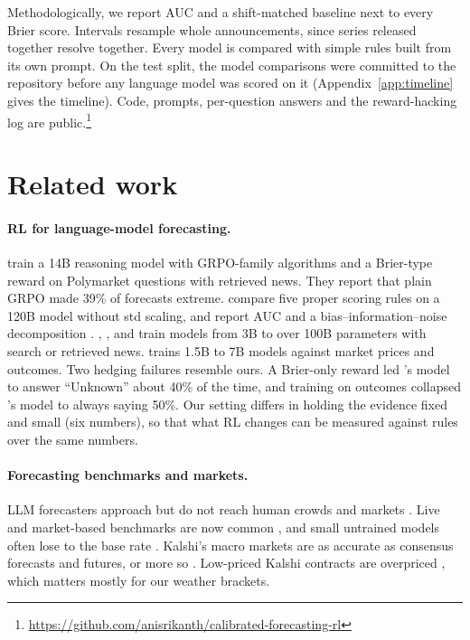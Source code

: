 \documentclass[11pt]{article}
\begin{document}
Methodologically, we report AUC and a shift-matched baseline next to every Brier score. Intervals resample whole announcements, since series released together resolve together. Every model is compared with simple rules built from its own prompt. On the test split, the model comparisons were committed to the repository before any language model was scored on it (Appendix~\ref{app:timeline} gives the timeline). Code, prompts, per-question answers and the reward-hacking log are public.\footnote{\url{https://github.com/anisrikanth/calibrated-forecasting-rl}}

\section{Related work}

\paragraph{RL for language-model forecasting.} \citet{turtel2025outcome} train a 14B reasoning model with GRPO-family algorithms and a Brier-type reward on Polymarket questions with retrieved news. They report that plain GRPO made 39\% of forecasts extreme. \citet{turtel2026proper} compare five proper scoring rules on a 120B model without std scaling, and report AUC and a bias--information--noise decomposition \citep{satopaa2021bin}. \citet{chandak2025scaling}, \citet{afifi2026research}, \citet{ye2026alphabet} and \citet{han2026futureworld} train models from 3B to over 100B parameters with search or retrieved news. \citet{levy2025rl} trains 1.5B to 7B models against market prices and outcomes. Two hedging failures resemble ours. A Brier-only reward led \citet{chandak2025scaling}'s model to answer ``Unknown'' about 40\% of the time, and training on outcomes collapsed \citet{levy2025rl}'s model to always saying 50\%. Our setting differs in holding the evidence fixed and small (six numbers), so that what RL changes can be measured against rules over the same numbers.

\paragraph{Forecasting benchmarks and markets.} LLM forecasters approach but do not reach human crowds and markets \citep{halawi2024approaching,karger2025forecastbench,zou2022autocast}. Live and market-based benchmarks are now common \citep{zeng2026futurex,yang2025prophetarena,nel2025kalshibench}, and small untrained models often lose to the base rate \citep{li2026canllms}. Kalshi's macro markets are as accurate as consensus forecasts and futures, or more so \citep{diercks2026kalshi}. Low-priced Kalshi contracts are overpriced \citep{burgi2026makers}, which matters mostly for our weather brackets.
\end{document}
